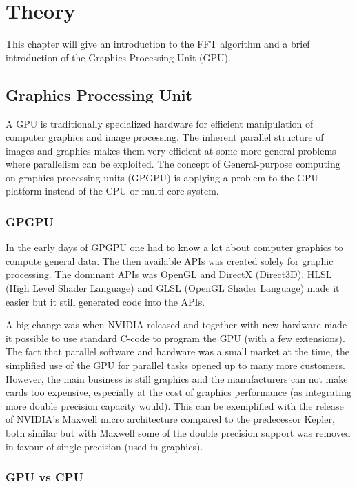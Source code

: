 \chapter{Theory}

This chapter will give an introduction to the FFT algorithm and a brief introduction of the Graphics Processing Unit (GPU).

\section{Graphics Processing Unit}

A GPU is traditionally specialized hardware for efficient manipulation of computer graphics and image processing. The inherent parallel structure of images and graphics makes them very efficient at some more general problems where parallelism can be exploited. The concept of General-purpose computing on graphics processing units (GPGPU) is applying a problem to the GPU platform instead of the CPU or multi-core system.

\subsection{GPGPU}

In the early days of GPGPU one had to know a lot about computer graphics to compute general data. The then available APIs was created solely for graphic processing. The dominant APIs was OpenGL and DirectX (Direct3D). HLSL (High Level Shader Language) and GLSL (OpenGL Shader Language) made it easier but it still generated code into the APIs.

A big change was when NVIDIA released {\CU} and together with new hardware made it possible to use standard C-code to program the GPU (with a few extensions). The fact that parallel software and hardware was a small market at the time, the simplified use of the GPU for parallel tasks opened up to many more customers. However, the main business is still graphics and the manufacturers can not make cards too expensive, especially at the cost of graphics performance (as integrating more double precision capacity would). This can be exemplified with the release of NVIDIA's Maxwell micro architecture compared to the predecessor Kepler, both similar but with Maxwell some of the double precision support was removed in favour of single precision (used in graphics).

\subsection{GPU vs CPU}

